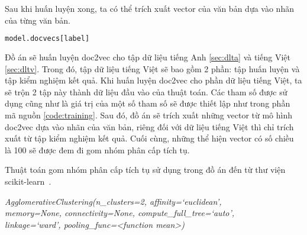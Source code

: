 Sau khi huấn luyện xong, ta có thể trích xuất vector của văn bản dựa vào nhãn của từng văn bản.
\begin{lstlisting}[language=Python]
model.docvecs[label]
\end{lstlisting}

Đồ án sẽ huấn luyện doc2vec cho tập dữ liệu tiếng Anh \ref{sec:dlta} và tiếng Việt \ref{sec:dltv}.
Trong đó, tập dữ liệu tiếng Việt sẽ bao gồm 2 phần: tập huấn luyện và tập kiểm nghiệm kết quả.
Khi huấn luyện doc2vec cho phần dữ liệu tiếng Việt, ta sẽ trộn 2 tập này thành dữ liệu đầu vào của thuật toán.
Các tham số được sử dụng cũng như là giá trị của một số tham số sẽ được thiết lập như trong phần mã nguồn \ref{code:training}.
Sau đó, đồ án sẽ trích xuất những vector từ mô hình doc2vec dựa vào nhãn của văn bản, riêng đối với dữ liệu tiếng Việt thì chỉ trích xuất từ tập kiểm nghiệm kết quả.
Cuối cùng, những thể hiện vector có số chiều là 100 sẽ được đem đi gom nhóm phân cấp tích tụ.

Thuật toán gom nhóm phân cấp tích tụ sử dụng trong đồ án đến từ thư viện scikit-learn~\cite{hac-scikit}.

\label{ahc-scikit}
\textit{AgglomerativeClustering(n{\_}clusters=2, affinity=`euclidean', \\
memory=None, connectivity=None, compute{\_}full{\_}tree=`auto', \\
linkage=`ward', pooling{\_}func=<function mean>)}

